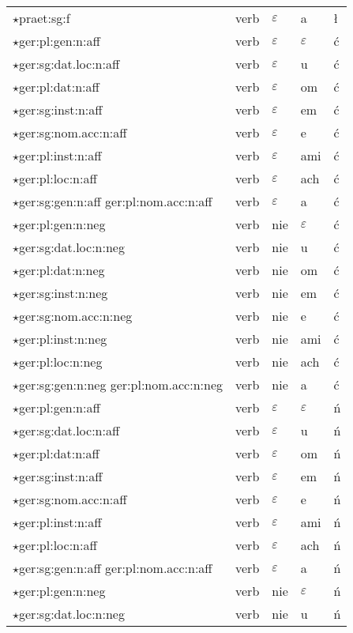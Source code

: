\documentclass{article}
\begin{document}
\begin{longtable}{p{7cm}|l|l|l|l}
$\star$praet:sg:f & verb & $\varepsilon$ & a & ł\\
$\star$ger:pl:gen:n:aff & verb & $\varepsilon$ & $\varepsilon$ & ć\\
$\star$ger:sg:dat.loc:n:aff & verb & $\varepsilon$ & u & ć\\
$\star$ger:pl:dat:n:aff & verb & $\varepsilon$ & om & ć\\
$\star$ger:sg:inst:n:aff & verb & $\varepsilon$ & em & ć\\
$\star$ger:sg:nom.acc:n:aff & verb & $\varepsilon$ & e & ć\\
$\star$ger:pl:inst:n:aff & verb & $\varepsilon$ & ami & ć\\
$\star$ger:pl:loc:n:aff & verb & $\varepsilon$ & ach & ć\\
$\star$ger:sg:gen:n:aff ger:pl:nom.acc:n:aff & verb & $\varepsilon$ & a & ć\\
$\star$ger:pl:gen:n:neg & verb & nie & $\varepsilon$ & ć\\
$\star$ger:sg:dat.loc:n:neg & verb & nie & u & ć\\
$\star$ger:pl:dat:n:neg & verb & nie & om & ć\\
$\star$ger:sg:inst:n:neg & verb & nie & em & ć\\
$\star$ger:sg:nom.acc:n:neg & verb & nie & e & ć\\
$\star$ger:pl:inst:n:neg & verb & nie & ami & ć\\
$\star$ger:pl:loc:n:neg & verb & nie & ach & ć\\
$\star$ger:sg:gen:n:neg ger:pl:nom.acc:n:neg & verb & nie & a & ć\\
$\star$ger:pl:gen:n:aff & verb & $\varepsilon$ & $\varepsilon$ & ń\\
$\star$ger:sg:dat.loc:n:aff & verb & $\varepsilon$ & u & ń\\
$\star$ger:pl:dat:n:aff & verb & $\varepsilon$ & om & ń\\
$\star$ger:sg:inst:n:aff & verb & $\varepsilon$ & em & ń\\
$\star$ger:sg:nom.acc:n:aff & verb & $\varepsilon$ & e & ń\\
$\star$ger:pl:inst:n:aff & verb & $\varepsilon$ & ami & ń\\
$\star$ger:pl:loc:n:aff & verb & $\varepsilon$ & ach & ń\\
$\star$ger:sg:gen:n:aff ger:pl:nom.acc:n:aff & verb & $\varepsilon$ & a & ń\\
$\star$ger:pl:gen:n:neg & verb & nie & $\varepsilon$ & ń\\
$\star$ger:sg:dat.loc:n:neg & verb & nie & u & ń\\

\end{longtable}
\end{document}
